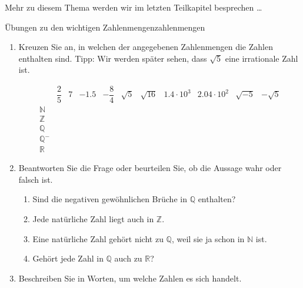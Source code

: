 Mehr zu diesem Thema werden wir im letzten Teilkapitel besprechen \dots

\clearpage

\begin{ueb}
    {Übungen zu den wichtigen Zahlenmengen}{zahlenmengen}

    \begin{enumerate}
        \item Kreuzen Sie an, in welchen der angegebenen Zahlenmengen die Zahlen enthalten sind. Tipp: Wir werden später sehen, dass \(\sqrt{5}\) eine irrationale Zahl ist.

              \[
                  \begin{array}{c|c|c|c|c|c|c|c|c|c|c}
                                   & \dfrac{2}{5}   & 7               & -1.5      & -\dfrac{8}{4} & \sqrt{5} & \sqrt{16}
                                   & 1.4 \cdot 10^3 & 2.04 \cdot 10^2 & \sqrt{-5} & -\sqrt{5}                                       \\ \hline
                      \mathbb{N}   &                &                 &           &               &          &           &  &  &  & \\ \hline
                      \mathbb{Z}   &                &                 &           &               &          &           &  &  &  & \\ \hline
                      \mathbb{Q}   &                &                 &           &               &          &           &  &  &  & \\ \hline
                      \mathbb{Q}^- &                &                 &           &               &          &           &  &  &  & \\ \hline
                      \mathbb{R}   &                &                 &           &               &          &           &  &  &  &
                  \end{array}
              \]

        \item
              Beantworten Sie die Frage oder beurteilen Sie, ob die Aussage wahr oder falsch ist.

              \begin{enumerate}
                  \item Sind die negativen gewöhnlichen Brüche in \(\mathbb{Q}\) enthalten?
                  \item Jede natürliche Zahl liegt auch in \(\mathbb{Z}\).
                  \item Eine natürliche Zahl gehört nicht zu \(\mathbb{Q}\), weil sie ja schon in \(\mathbb{N}\) ist.
                  \item Gehört jede Zahl in \(\mathbb{Q}\) auch zu \(\mathbb{R}\)?
              \end{enumerate}
        \item Beschreiben Sie in Worten, um welche Zahlen es sich handelt.


\end{enumerate}
\end{ueb}
